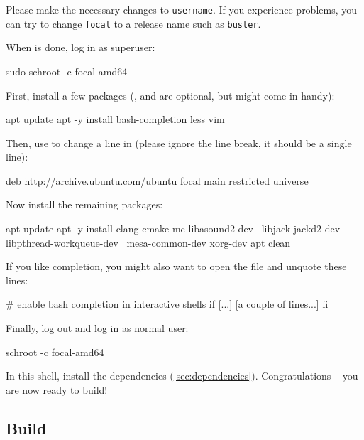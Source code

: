 Please make the necessary changes to \texttt{username}.  If you
experience problems, you can try to change \texttt{focal} to a
release name such as \texttt{buster}.

When  is done, log in as superuser:

\begin{Verbatim64}
  sudo schroot -c focal-amd64
\end{Verbatim64}

First, install a few packages (,  and 
are optional, but might come in handy):

\begin{VerbatimBoth}
  apt update
  apt -y install bash-completion less vim
\end{VerbatimBoth}

Then, use  to change a line in 
(please ignore the line break, it should be a single line):

\begin{VerbatimBoth}
  deb http://archive.ubuntu.com/ubuntu focal
  main restricted universe
\end{VerbatimBoth}

Now install the remaining packages:

\begin{VerbatimBoth}
  apt update
  apt -y install clang cmake mc libasound2-dev \
    libjack-jackd2-dev libpthread-workqueue-dev \
    mesa-common-dev xorg-dev
  apt clean
\end{VerbatimBoth}

If you like  completion, you might also want to open the
file  and unquote these lines:

\begin{VerbatimBoth}
  # enable bash completion in interactive shells
  if [...]
    [a couple of lines...]
  fi
\end{VerbatimBoth}

Finally, log out and log in as normal user:

\begin{Verbatim64}
  schroot -c focal-amd64
\end{Verbatim64}

In this  shell, install the dependencies
(\ref{sec:dependencies}).  Congratulations -- you are now ready to
build!

\newpage %

\subsection{Build}

